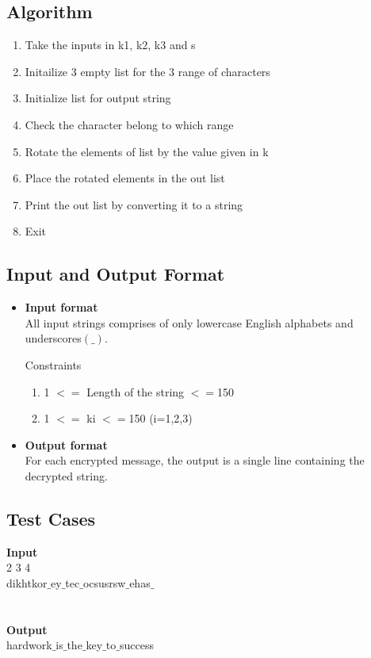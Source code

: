 \documentclass[12pt]{article}
\begin{document}
{{	\subsection{Algorithm}
	{
		\begin{enumerate}
			\item Take the inputs in k1, k2, k3 and s
			\item Initailize 3 empty list for the 3 range of characters
			\item Initialize list for output string
			\item Check the character belong to which range
			\item Rotate the elements of list by the value given in k
			\item Place the rotated elements in the out list
			\item Print the out list by converting it to a string
			\item Exit
		\end{enumerate} 
	}
	
	
	\subsection{Input and Output Format}
	{
		\begin{itemize}
			\item 
			
			\textbf{Input format} \\
			All input strings comprises of only lowercase English alphabets and underscores$(\_)$.
			
			Constraints
			\begin{enumerate}
				\item 1 $<=$ Length of the string $<=$150
				\item 1 $<=$ ki $<=$150 (i=1,2,3)
			\end{enumerate}
			\item
			\textbf{Output format} \\
			For each encrypted message, the output is a single line containing the decrypted string.
		\end{itemize}
	}
	
	\subsection{Test Cases}
	\textbf{Input} \\
	2 3 4\\
	dikhtkor$\_$ey$\_$tec$\_$ocsusrsw$\_$ehas$\_$\\	
	\\ \\
	\textbf{Output}\\
	hardwork$\_$is$\_$the$\_$key$\_$to$\_$success\\
	
}}
\end{document}
